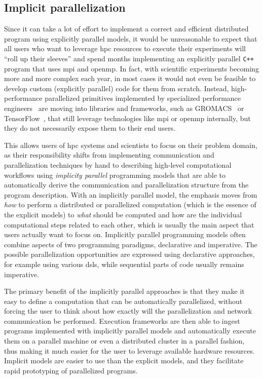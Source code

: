 \subsection*{Implicit parallelization}
Since it can take a lot of effort to implement a correct and efficient distributed program using
explicitly parallel models, it would be unreasonable to expect that all users who want to leverage
\gls{hpc} resources to execute their experiments will ``roll up their sleeves'' and
spend months implementing an explicitly parallel \texttt{C++} program that uses
\gls{mpi} and \gls{openmp}. In fact, with scientific experiments becoming
more and more complex each year, in most cases it would not even be feasible to develop custom
(explicitly parallel) code for them from scratch. Instead, high-performance parallelized primitives
implemented by specialized performance engineers~\cite{dace} are moving into libraries
and frameworks, such as GROMACS~\cite{gromacs,gromacs_mpi} or TensorFlow~\cite{tensorflow,horovod}, that
still leverage technologies like \gls{mpi} or \gls{openmp} internally, but
they do not necessarily expose them to their end users.

This allows users of \gls{hpc} systems and scientists to focus on their problem
domain, as their responsibility shifts from implementing communication and parallelization
techniques by hand to describing high-level computational workflows using \emph{implicity parallel}
programming models that are able to automatically derive the communication and parallelization
structure from the program description. With an implicitly parallel model, the emphasis moves from
\emph{how} to perform a distributed or parallelized computation (which is the essence
of the explicit models) to \emph{what} should be computed and how are the individual
computational steps related to each other, which is usually the main aspect that users actually
want to focus on. Implicitly parallel programming models often combine aspects of two programming
paradigms, declarative and imperative. The possible parallelization opportunities are expressed
using declarative approaches, for example using various \glspl{dsl}, while sequential
parts of code usually remains imperative.

The primary benefit of the implicitly parallel approaches is that they make it easy to define a
computation that can be automatically parallelized, without forcing the user to think about how
exactly will the parallelization and network communication be performed. Execution frameworks are
then able to ingest programs implemented with implicitly parallel models and automatically execute
them on a parallel machine or even a distributed cluster in a parallel fashion, thus making it much
easier for the user to leverage available hardware resources. Implicit models are easier to use
than the explicit models, and they facilitate rapid prototyping of parallelized programs.

